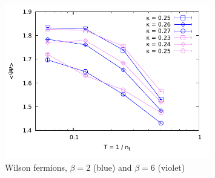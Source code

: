 \documentclass[12pt,a4paper]{article}
\begin{document}
\begin{figure}[t]
  \centering
  \includegraphics[width=0.8\textwidth]{Wilson/pbp-all}
  \caption{Wilson fermions, $\beta = 2$ (blue) and $\beta = 6$ (violet)}
  \label{fig:wilson-all-beta}
\end{figure}


{}
\end{document}

